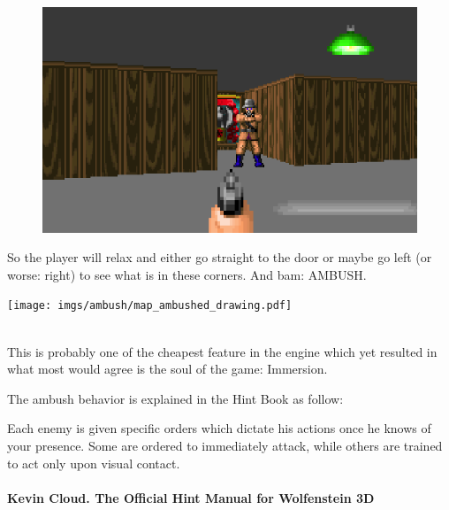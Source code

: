 \par
\begin{figure}[H]
 \centering
 \includegraphics[width=\textwidth]{imgs/ambush/map_ambushed.png}
\end{figure}
\par
\begin{minipage}{0.6\textwidth}
So the player will relax and either go straight to the door or maybe go left (or worse: right) to see what is in these corners. And bam: AMBUSH.
\end{minipage}
\begin{minipage}{0.4\textwidth}
\begin{flushright}
\texttt{[image: imgs/ambush/map\_ambushed\_drawing.pdf]}
\end{flushright}
\end{minipage}
\noindent
\\

This is probably one of the cheapest feature in the engine which yet resulted in what most would agree is the soul of the game: Immersion.\\
\par

 The ambush behavior is explained in the Hint Book as follow:\\
\par
\begin{fancyquotes}
Each enemy is given specific orders which dictate his actions once he knows of your presence. Some are ordered to immediately attack, while others are trained to act only upon visual contact.
 \bigskip \\
\bigskip \\
\textbf{Kevin Cloud. The Official Hint Manual for Wolfenstein 3D}
 \end{fancyquotes}

